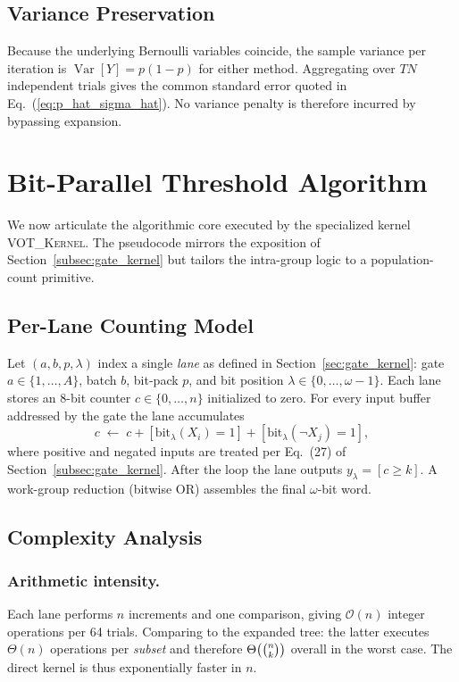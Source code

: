 \subsection{Variance Preservation}
\label{sec:voter_variance}

Because the underlying Bernoulli variables coincide, the sample variance per
iteration is
\(
  \operatorname{Var}[Y] = p(1-p)
\)
for either method.  Aggregating over $T N$ independent trials gives the common
standard error quoted in Eq.~(\ref{eq:p_hat_sigma_hat}).  No variance penalty
is therefore incurred by bypassing expansion.

\section{Bit-Parallel Threshold Algorithm}
\label{sec:voter_algorithm}

We now articulate the algorithmic core executed by the specialized kernel
\textsc{VOT\_Kernel}.  The pseudocode mirrors the exposition of
Section~\ref{subsec:gate_kernel} but tailors the intra-group logic to a
population-count primitive.

\subsection{Per-Lane Counting Model}

Let $(a,b,p,\lambda)$ index a single \emph{lane} as defined in
Section~\ref{sec:gate_kernel}: gate $a\in\{1,\dots,A\}$, batch $b$, bit-pack
$p$, and bit position $\lambda\in\{0,\dots,\omega-1\}$.  Each lane stores an
8-bit counter $c\in\{0,\dots,n\}$ initialized to zero.  For every input buffer
addressed by the gate the lane accumulates
\[
  c\;\leftarrow\;c + [\text{bit}_{\lambda}(X_i)=1] + [\text{bit}_{\lambda}(\lnot X_j)=1],
\]
where positive and negated inputs are treated per
Eq.~(27) of Section~\ref{subsec:gate_kernel}.  After the loop the lane outputs
\(
  y_{\lambda} = [c\ge k].
\)
A work-group reduction (bitwise OR) assembles the final $\omega$-bit word.

\subsection{Complexity Analysis}
\label{sec:voter_complexity}

\subsubsection{Arithmetic intensity.}  Each lane performs $n$ increments and one
comparison, giving $\mathcal{O}(n)$ integer operations per 64 trials.
Comparing to the expanded tree: the latter executes $\Theta(n)$ operations per
\emph{subset} and therefore $\Theta\bigl(\tbinom{n}{k}\bigr)$ overall in the
worst case.  The direct kernel is thus exponentially faster in $n$.

